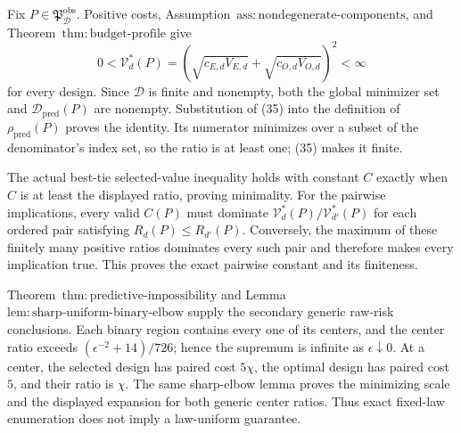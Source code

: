 Fix \(P\in\mathfrak P_{\mathcal D}^{\mathrm{obs}}\). Positive costs, Assumption~\(\mathrm{ass{:}nondegenerate\text{-}components}\), and Theorem~\(\mathrm{thm{:}budget\text{-}profile}\) give
\[
 0<\mathcal V_d^*(P)
 =\left(\sqrt{c_{E,d}V_{E,d}}+\sqrt{c_{O,d}V_{O,d}}\right)^2
 <\infty                                                    \tag{35}
\]
for every design. Since \(\mathcal D\) is finite and nonempty, both the global minimizer set and \(\mathcal D_{\mathrm{pred}}(P)\) are nonempty. Substitution of (35) into the definition of \(\rho_{\mathrm{pred}}(P)\) proves the identity. Its numerator minimizes over a subset of the denominator's index set, so the ratio is at least one; (35) makes it finite.

The actual best-tie selected-value inequality holds with constant \(C\) exactly when \(C\) is at least the displayed ratio, proving minimality. For the pairwise implications, every valid \(C(P)\) must dominate \(\mathcal V_d^*(P)/\mathcal V_{d'}^*(P)\) for each ordered pair satisfying \(R_d(P)\le R_{d'}(P)\). Conversely, the maximum of these finitely many positive ratios dominates every such pair and therefore makes every implication true. This proves the exact pairwise constant and its finiteness.

Theorem~\(\mathrm{thm{:}predictive\text{-}impossibility}\) and Lemma~\(\mathrm{lem{:}sharp\text{-}uniform\text{-}binary\text{-}elbow}\) supply the secondary generic raw-risk conclusions. Each binary region contains every one of its centers, and the center ratio exceeds \((\epsilon^{-2}+14)/726\); hence the supremum is infinite as \(\epsilon\downarrow0\). At a center, the selected design has paired cost \(5\chi\), the optimal design has paired cost \(5\), and their ratio is \(\chi\). The same sharp-elbow lemma proves the minimizing scale and the displayed expansion for both generic center ratios. Thus exact fixed-law enumeration does not imply a law-uniform guarantee.
